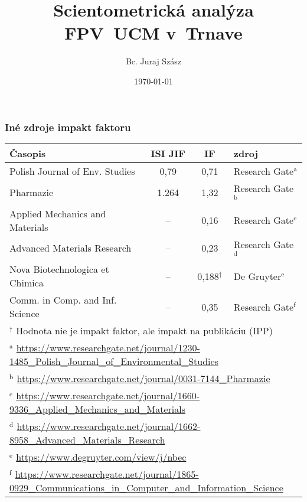 \documentclass{beamer}
\author{Bc. Juraj Szász}
\title{Scientometrická analýza FPV~UCM v~Trnave}
\date{\today}
\begin{document}

\frame{\maketitle}

\frame{\tableofcontents}

\begin{frame}
  \frametitle{Iné zdroje impakt faktoru}
  \begin{table}
    \small\centering
    \begin{tabular}{lccl}
      \toprule
      Časopis & ISI JIF & IF & zdroj \\
      \midrule
      Polish Journal of Env. Studies  & 0,79  & 0,71           & Research Gate$^{\mathrm{a}}$ \\[0.5ex]
      Pharmazie                       & 1.264 & 1,32           & Research Gate$^{\mathrm{b}}$ \\[0.5ex]
      Applied Mechanics and Materials & --    & 0,16           & Research Gate$^{\mathrm{c}}$ \\[0.5ex]
      Advanced Materials Research     & --    & 0,23           & Research Gate$^{\mathrm{d}}$ \\[0.5ex]
      Nova Biotechnologica et Chimica & --    & 0,188$^\dagger$ & De Gruyter$^{\mathrm{e}}$    \\[0.5ex]
      Comm. in Comp. and Inf. Science & --    & 0,35           & Research Gate$^{\mathrm{f}}$ \\[0.5ex]
      \bottomrule
      \multicolumn{4}{l}{\tiny $^\dagger$ Hodnota nie je impakt faktor, ale impakt na publikáciu (IPP)} \\
      \multicolumn{4}{l}{\tiny $^{\mathrm{a}}$ \url{https://www.researchgate.net/journal/1230-1485\_Polish\_Journal\_of\_Environmental\_Studies}} \\
      \multicolumn{4}{l}{\tiny $^{\mathrm{b}}$ \url{https://www.researchgate.net/journal/0031-7144\_Pharmazie}} \\
      \multicolumn{4}{l}{\tiny $^{\mathrm{c}}$ \url{https://www.researchgate.net/journal/1660-9336\_Applied\_Mechanics\_and\_Materials}} \\
      \multicolumn{4}{l}{\tiny $^{\mathrm{d}}$ \url{https://www.researchgate.net/journal/1662-8958\_Advanced\_Materials\_Research}} \\
      \multicolumn{4}{l}{\tiny $^{\mathrm{e}}$ \url{https://www.degruyter.com/view/j/nbec}} \\
      \multicolumn{4}{l}{\tiny $^{\mathrm{f}}$ \url{https://www.researchgate.net/journal/1865-0929\_Communications\_in\_Computer\_and\_Information\_Science}} \\
    \end{tabular}
  \end{table}
\end{frame}

\end{document}
